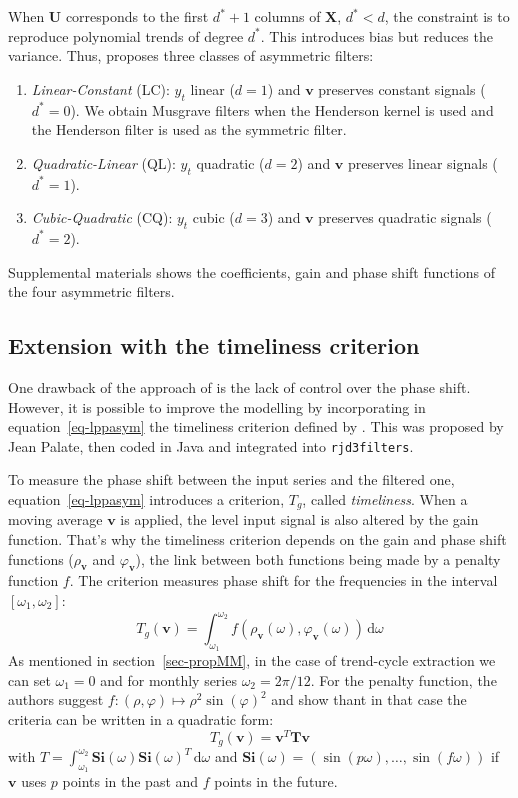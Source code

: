 \documentclass[
]{article}
\newcommand\transp[1]{{#1}^T}
\newcommand\1{\mathds{1}}
\newcommand\ud{\,\mathrm{d}}
\begin{document}
When \(\boldsymbol U\) corresponds to the first \(d^*+1\) columns of
\(\boldsymbol X\), \(d^*<d\), the constraint is to reproduce polynomial
trends of degree \(d^*\). This introduces bias but reduces the variance.
Thus, \textcite{proietti2008} proposes three classes of asymmetric
filters:

\begin{enumerate}
\def\labelenumi{\arabic{enumi}.}
\item
  \emph{Linear-Constant} (LC): \(y_t\) linear (\(d=1\)) and
  \(\boldsymbol v\) preserves constant signals (\(d^*=0\)). We obtain
  Musgrave filters when the Henderson kernel is used and the Henderson
  filter is used as the symmetric filter.
\item
  \emph{Quadratic-Linear} (QL): \(y_t\) quadratic (\(d=2\)) and
  \(\boldsymbol v\) preserves linear signals (\(d^*=1\)).
\item
  \emph{Cubic-Quadratic} (CQ): \(y_t\) cubic (\(d=3\)) and
  \(\boldsymbol v\) preserves quadratic signals (\(d^*=2\)).
\end{enumerate}

Supplemental materials shows the coefficients, gain and phase shift
functions of the four asymmetric filters.

\subsection{Extension with the timeliness
criterion}\label{sec-lptimeliness}

One drawback of the approach of \textcite{proietti2008} is the lack of
control over the phase shift. However, it is possible to improve the
modelling by incorporating in equation~\ref{eq-lppasym} the timeliness
criterion defined by \textcite{ch15HBSA}. This was proposed by Jean
Palate, then coded in Java and integrated into \texttt{rjd3filters}.

To measure the phase shift between the input series and the filtered
one, equation~\ref{eq-lppasym} introduces a criterion, \(T_g\), called
\emph{timeliness}. When a moving average \(\boldsymbol v\) is applied,
the level input signal is also altered by the gain function. That's why
the timeliness criterion depends on the gain and phase shift functions
(\(\rho_{\boldsymbol v}\) and \(\varphi_{\boldsymbol v}\)), the link
between both functions being made by a penalty function \(f\). The
criterion measures phase shift for the frequencies in the interval
\([\omega_1, \omega_2]\): \[
T_g(\boldsymbol v)=\int_{\omega_{1}}^{\omega_{2}}f(\rho_{\boldsymbol v}(\omega),\varphi_{\boldsymbol v}(\omega))\ud\omega
\] As mentioned in section~\ref{sec-propMM}, in the case of trend-cycle
extraction we can set \(\omega_1=0\) and for monthly series
\(\omega_2=2\pi/12.\) For the penalty function, the authors suggest
\(f\colon(\rho,\varphi)\mapsto\rho^2\sin(\varphi)^2\) and show thant in
that case the criteria can be written in a quadratic form: \[
T_g(\boldsymbol v) = \transp{\boldsymbol v}\boldsymbol T\boldsymbol v
\] with
\(T\boldsymbol=\int_{\omega_{1}}^{\omega_{2}}\boldsymbol{Si}(\omega)\transp{\boldsymbol{Si}(\omega)}\ud\omega\)
and \(\boldsymbol{Si}(\omega)=(\sin(p\omega),\dots, \sin (f\omega))\) if
\(\boldsymbol v\) uses \(p\) points in the past and \(f\) points in the
future.
\end{document}

